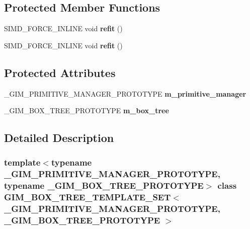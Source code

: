 \subsection*{Protected Member Functions}
\begin{DoxyCompactItemize}
\item 
\mbox{\label{classGIM__BOX__TREE__TEMPLATE__SET_ab4d10c875575e2bae32f918ce79b9455}} 
S\+I\+M\+D\+\_\+\+F\+O\+R\+C\+E\+\_\+\+I\+N\+L\+I\+NE void {\bfseries refit} ()
\item 
\mbox{\label{classGIM__BOX__TREE__TEMPLATE__SET_ab4d10c875575e2bae32f918ce79b9455}} 
S\+I\+M\+D\+\_\+\+F\+O\+R\+C\+E\+\_\+\+I\+N\+L\+I\+NE void {\bfseries refit} ()
\end{DoxyCompactItemize}
\subsection*{Protected Attributes}
\begin{DoxyCompactItemize}
\item 
\mbox{\label{classGIM__BOX__TREE__TEMPLATE__SET_a02c6c5d8a88dda04e4430f46a8602656}} 
\+\_\+\+G\+I\+M\+\_\+\+P\+R\+I\+M\+I\+T\+I\+V\+E\+\_\+\+M\+A\+N\+A\+G\+E\+R\+\_\+\+P\+R\+O\+T\+O\+T\+Y\+PE {\bfseries m\+\_\+primitive\+\_\+manager}
\item 
\mbox{\label{classGIM__BOX__TREE__TEMPLATE__SET_a8ad508edb1e059c6be39c784a8210f31}} 
\+\_\+\+G\+I\+M\+\_\+\+B\+O\+X\+\_\+\+T\+R\+E\+E\+\_\+\+P\+R\+O\+T\+O\+T\+Y\+PE {\bfseries m\+\_\+box\+\_\+tree}
\end{DoxyCompactItemize}


\subsection{Detailed Description}
\subsubsection*{template$<$typename \+\_\+\+G\+I\+M\+\_\+\+P\+R\+I\+M\+I\+T\+I\+V\+E\+\_\+\+M\+A\+N\+A\+G\+E\+R\+\_\+\+P\+R\+O\+T\+O\+T\+Y\+PE, typename \+\_\+\+G\+I\+M\+\_\+\+B\+O\+X\+\_\+\+T\+R\+E\+E\+\_\+\+P\+R\+O\+T\+O\+T\+Y\+PE$>$\newline
class G\+I\+M\+\_\+\+B\+O\+X\+\_\+\+T\+R\+E\+E\+\_\+\+T\+E\+M\+P\+L\+A\+T\+E\+\_\+\+S\+E\+T$<$ \+\_\+\+G\+I\+M\+\_\+\+P\+R\+I\+M\+I\+T\+I\+V\+E\+\_\+\+M\+A\+N\+A\+G\+E\+R\+\_\+\+P\+R\+O\+T\+O\+T\+Y\+P\+E, \+\_\+\+G\+I\+M\+\_\+\+B\+O\+X\+\_\+\+T\+R\+E\+E\+\_\+\+P\+R\+O\+T\+O\+T\+Y\+P\+E $>$}

